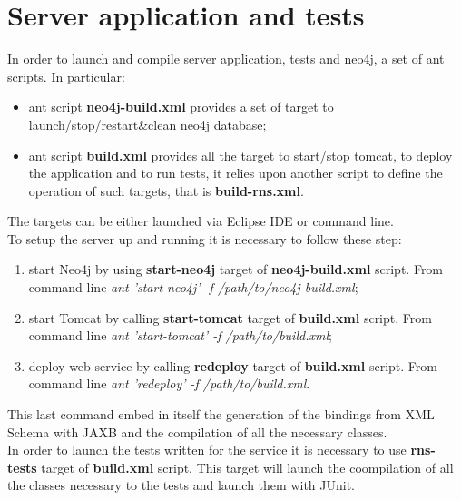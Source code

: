 \section{Server application and tests}
In order to launch and compile server application, tests and neo4j, a set of ant scripts. In particular:
\begin{itemize}
  \item ant script \textbf{neo4j-build.xml} provides a set of target to launch/stop/restart\&clean neo4j database;
  \item ant script \textbf{build.xml} provides all the target to start/stop tomcat, to deploy the application and to run tests, it relies upon another script to define the operation of such targets, that is \textbf{build-rns.xml}.
\end{itemize}
The targets can be either launched via Eclipse IDE or command line. \\
To setup the server up and running it is necessary to follow these step:
\begin{enumerate}
  \item start Neo4j by using \textbf{start-neo4j} target of \textbf{neo4j-build.xml} script. From command line \textit{ant 'start-neo4j' -f /path/to/neo4j-build.xml};
  \item start Tomcat by calling \textbf{start-tomcat} target of \textbf{build.xml} script. From command line \textit{ant 'start-tomcat' -f /path/to/build.xml};
  \item deploy web service by calling \textbf{redeploy} target of \textbf{build.xml} script. From command line \textit{ant 'redeploy' -f /path/to/build.xml}.
\end{enumerate}
This last command embed in itself the generation of the bindings from XML Schema with JAXB and the compilation of all the necessary classes.\\
In order to launch the tests written for the service it is necessary to use \textbf{rns-tests} target of \textbf{build.xml} script. This target will launch the coompilation of all the classes necessary to the tests and launch them with JUnit.
